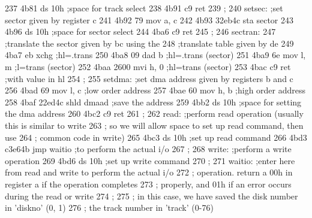 237      4b81                      ds     10h            ;space for track select
238      4b91 c9                   ret
239                       ;
240                       setsec:  ;set sector given by register c
241      4b92 79                   mov    a, c
242      4b93 32eb4c               sta    sector
243      4b96                      ds     10h            ;space for sector select
244      4ba6 c9                   ret
245                       ;
246                       sectran:
247                                ;translate the sector given by bc using the
248                                ;translate table given by de
249      4ba7 eb                   xchg                  ;hl=.trans
250      4ba8 09                   dad    b              ;hl=.trans (sector)
251      4ba9 6e                   mov    l, m           ;l=trans (sector)
252      4baa 2600                 mvi    h, 0           ;hl=trans (sector)
253      4bac c9                   ret                   ;with value in hl
254                       ;
255                       setdma:  ;set dma address given by registers b and c
256      4bad 69                   mov    l, c           ;low order address
257      4bae 60                   mov    h, b           ;high order address
258      4baf 22ed4c               shld   dmaad          ;save the address
259      4bb2                      ds     10h            ;space for setting the dma address
260      4bc2 c9                   ret
261                       ;
262                       read:    ;perform read operation (usually this is similar to write
263                       ;        so we will allow space to set up read command, then use
264                       ;        common code in write)
265      4bc3                      ds     10h            ;set up read command
266      4bd3 c3e64b               jmp    waitio         ;to perform the actual i/o
267                       ;
268                       write:   ;perform a write operation
269      4bd6                      ds     10h            ;set up write command
270                       ;
271                       waitio:  ;enter here from read and write to perform the actual i/o
272                       ;        operation. return a 00h in register a if the operation completes
273                       ;        properly, and 01h if an error occurs during the read or write
274                       ;
275                       ;        in this case, we have saved the disk number in 'diskno' (0, 1)
276                       ;                              the track number in 'track' (0-76)
